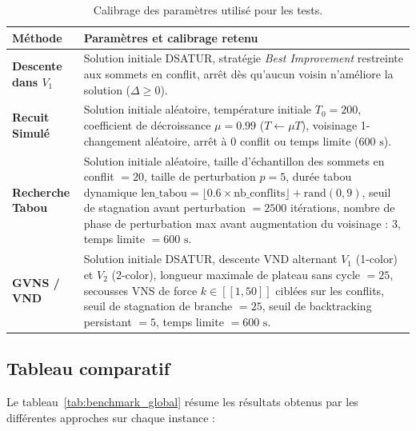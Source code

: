 \documentclass{article}
\begin{document}
\begin{table}[H]
\centering
\small
\begin{tabular}{lp{11cm}}
\toprule
\textbf{Méthode} & \textbf{Paramètres et calibrage retenu} \\
\midrule
\textbf{Descente dans $V_1$} & Solution initiale DSATUR, stratégie \textit{Best Improvement} restreinte aux sommets en conflit, arrêt dès qu'aucun voisin n'améliore la solution ($\Delta \ge 0$). \\
\addlinespace
\textbf{Recuit Simulé} & Solution initiale aléatoire, température initiale $T_0 = 200$, coefficient de décroissance $\mu = 0.99$ ($T \leftarrow \mu T$), voisinage 1-changement aléatoire, arrêt à 0 conflit ou temps limite ($600\text{ s}$). \\
\addlinespace
\textbf{Recherche Tabou} & Solution initiale aléatoire, taille d'échantillon des sommets en conflit $= 20$, taille de perturbation $p = 5$, durée tabou dynamique $\text{len\_tabou} = \lfloor 0.6 \times \text{nb\_conflits} \rfloor + \text{rand}(0, 9)$, seuil de stagnation avant perturbation $= 2500$ itérations, nombre de phase de perturbation max avant augmentation du voisinage : 3, temps limite $= 600\text{ s}$. \\
\addlinespace
\textbf{GVNS / VND} & Solution initiale DSATUR, descente VND alternant $V_1$ (1-color) et $V_2$ (2-color), longueur maximale de plateau sans cycle $= 25$, secousses VNS de force $k \in [\![1, 50]\!]$ ciblées sur les conflits, seuil de stagnation de branche $= 25$, seuil de backtracking persistant $= 5$, temps limite $= 600\text{ s}$. \\
\bottomrule
\end{tabular}
\caption{Calibrage des paramètres utilisé pour les tests.}
\label{tab:calibrage_parametres}
\end{table}

\subsection{Tableau comparatif}
Le tableau~\ref{tab:benchmark_global} résume les résultats obtenus par les différentes approches sur chaque instance :
\end{document}
